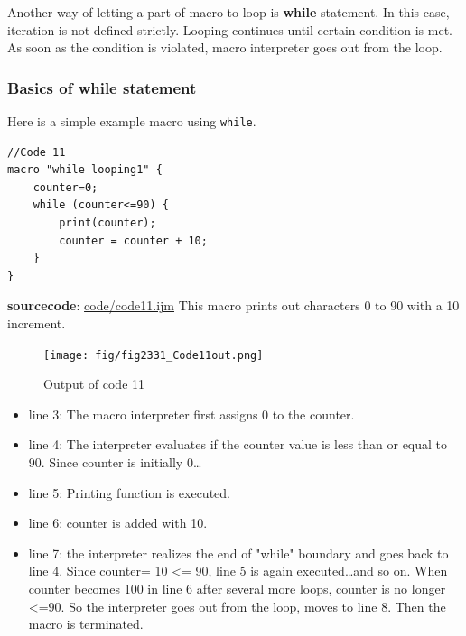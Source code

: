 \documentclass[11pt,a4paper,oneside]{report}
\newcommand{\ilcom}[1]{\texttt{\small#1}}
\begin{document}
Another way of letting a part of macro to loop is \textbf{while}-statement. In this case, iteration is not defined strictly. Looping continues until certain condition is met. As soon as the condition is violated, macro interpreter goes out from the loop.

\subsubsection{Basics of while statement}
Here is a simple example macro using \ilcom{while}.

\begin{lstlisting}[morekeywords={*, while}]
//Code 11
macro "while looping1" {
	counter=0;
	while (counter<=90) {
		print(counter);
		counter = counter + 10;
	}
}
\end{lstlisting}
\textbf{sourcecode}: \href{http://www.example.com/contents}{code/code11.ijm}
This macro prints out characters 0 to 90 with a 10 increment. 

\begin{figure}[htbp]
\begin{center}
\texttt{[image: fig/fig2331\_Code11out.png]}
\caption{Output of code 11}
\label{fig:code11 output}
\end{center}
\end{figure} 

\begin{itemize}
\item line 3: The macro interpreter first assigns 0 to the counter.
\item line 4: The interpreter evaluates if the counter value is less than or equal to 90. Since counter is initially 0\ldots 
\item line 5: Printing function is executed. 
\item line 6: counter is added with 10. 
\item line 7: the interpreter realizes the end of "while" boundary and goes back to line 4. Since counter= 10 <= 90, line 5 is again executed\ldots and so on. When counter becomes 100 in line 6 after several more loops, counter is no longer <=90. So the interpreter goes out from the loop, moves to line 8. Then the macro is terminated.
\end{itemize}
\end{document}
